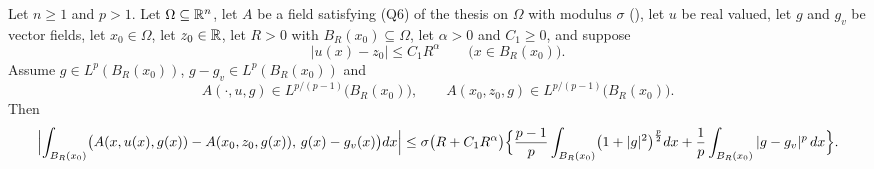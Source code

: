 \begin{lemma}
Let $n\ge1$ and $p>1$.  Let $\Omega\subseteq\mathbb{R}^n$, let $A$ be a field satisfying
(Q6) of the thesis on $\Omega$ with modulus $\sigma$
(), let $u$ be real valued, let $g$ and $g_v$ be
vector fields, let $x_0\in\Omega$, let $z_0\in\mathbb{R}$, let $R>0$ with
$B_R(x_0)\subseteq\Omega$, let $\alpha>0$ and $C_1\ge0$, and suppose
\[
|u(x)-z_0|\le C_1R^{\alpha}\qquad\bigl(x\in B_R(x_0)\bigr).
\]
Assume $g\in L^p(B_R(x_0))$, $g-g_v\in L^p(B_R(x_0))$ and
\[
A(\cdot,u,g)\in L^{p/(p-1)}\bigl(B_R(x_0)\bigr),
\qquad
A(x_0,z_0,g)\in L^{p/(p-1)}\bigl(B_R(x_0)\bigr).
\]
Then
\[
\Bigl|\int_{B_R(x_0)}\bigl(A(x,u(x),g(x))-A(x_0,z_0,g(x)),\,g(x)-g_v(x)\bigr)dx\Bigr|
\le\sigma\bigl(R+C_1R^{\alpha}\bigr)
\Bigl\{\frac{p-1}p\int_{B_R(x_0)}\bigl(1+|g|^2\bigr)^{\frac p2}dx
+\frac1p\int_{B_R(x_0)}|g-g_v|^p\,dx\Bigr\}.
\]
\end{lemma}
